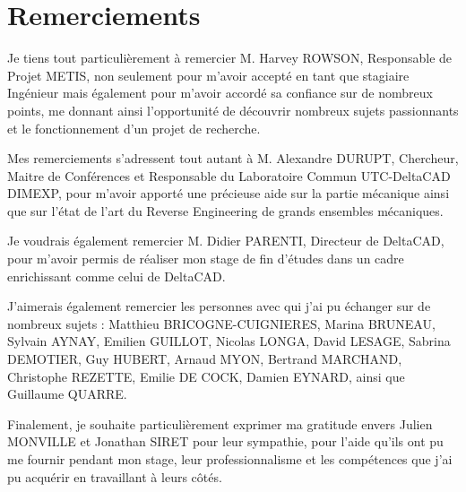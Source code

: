 \chapter*{Remerciements}


Je tiens tout particulièrement à remercier M. Harvey ROWSON, Responsable de Projet METIS, non seulement pour m’avoir accepté en tant que stagiaire Ingénieur mais également pour m’avoir accordé sa confiance sur de nombreux points, me donnant ainsi l’opportunité de découvrir nombreux sujets passionnants et le fonctionnement d'un projet de recherche. 

Mes remerciements s’adressent tout autant à M. Alexandre DURUPT, Chercheur, Maitre de Conférences et Responsable du Laboratoire Commun UTC-DeltaCAD DIMEXP, pour m'avoir apporté une précieuse aide sur la partie mécanique ainsi que sur l'état de l'art du Reverse Engineering de grands ensembles mécaniques.

Je voudrais également remercier M. Didier PARENTI, Directeur de DeltaCAD, pour m'avoir permis de réaliser mon stage de fin d'études dans un cadre enrichissant comme celui de DeltaCAD.

J’aimerais également remercier les personnes avec qui j'ai pu échanger sur de nombreux sujets : Matthieu BRICOGNE-CUIGNIERES, Marina BRUNEAU, Sylvain AYNAY, Emilien GUILLOT, Nicolas LONGA, David LESAGE, Sabrina DEMOTIER, Guy HUBERT, Arnaud MYON, Bertrand MARCHAND, Christophe REZETTE, Emilie DE COCK, Damien EYNARD, ainsi que Guillaume QUARRE. 

Finalement, je souhaite particulièrement exprimer ma gratitude envers Julien MONVILLE et Jonathan SIRET pour leur sympathie, pour l’aide qu’ils ont pu me fournir pendant mon stage, leur professionnalisme et les compétences que j’ai pu acquérir en travaillant à leurs côtés.